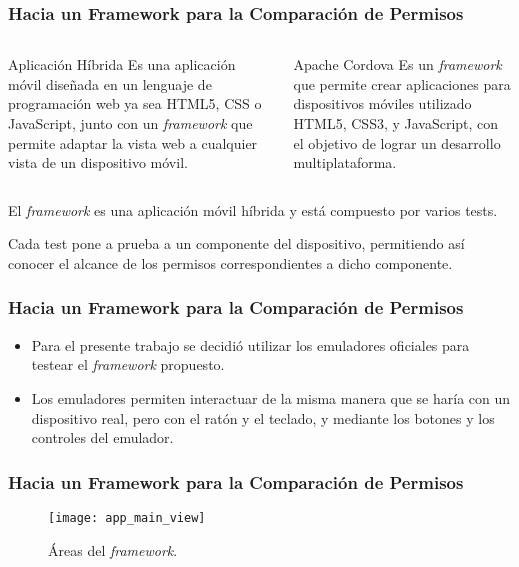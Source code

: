 \begin{frame}
\frametitle{Hacia un Framework para la Comparación de Permisos}
\begin{columns}
  \begin{column}[]{.60\textwidth}
   \begin{alertblock}{Aplicación Híbrida}
Es una aplicación móvil diseñada en un lenguaje de programación web ya sea HTML5, CSS o JavaScript, junto con un \emph{framework} que permite adaptar la vista web a cualquier vista de un dispositivo móvil.
   \end{alertblock}
  \end{column}
  \begin{column}[]{.35\textwidth}\pause
   \begin{block}{Apache Cordova}
Es un \emph{framework} que permite crear aplicaciones para dispositivos móviles utilizado HTML5, CSS3, y JavaScript, con el objetivo de lograr un desarrollo multiplataforma.
   \end{block}
  \end{column}
 \end{columns}\pause
 \begin{block}{}
El \textit{framework} es \alert{una aplicación móvil híbrida} \pause {} \pause y está compuesto por varios tests.
 \end{block}\pause
 \begin{block}{}
Cada test pone a prueba a un componente del dispositivo, permitiendo así conocer el alcance de los permisos correspondientes a dicho componente.
 \end{block}
\end{frame}
\begin{frame}
 \frametitle{Hacia un Framework para la Comparación de Permisos}
 \begin{itemize}
  \item Para el presente trabajo se decidió utilizar los emuladores oficiales para testear el \emph{framework} propuesto. \pause
  \item Los emuladores permiten interactuar de la misma manera que se haría con un dispositivo real, pero con el ratón y el teclado, y mediante los botones y los controles del emulador.
 \end{itemize}
\end{frame}
\begin{frame}
 \frametitle{Hacia un Framework para la Comparación de Permisos}
\begin{figure}[hbtp]
    \centering
	\texttt{[image: app\_main\_view]}
	\caption{Áreas del \textit{framework}.}
	\label{fig:chapter05:main_view}
\end{figure}
\end{frame}
